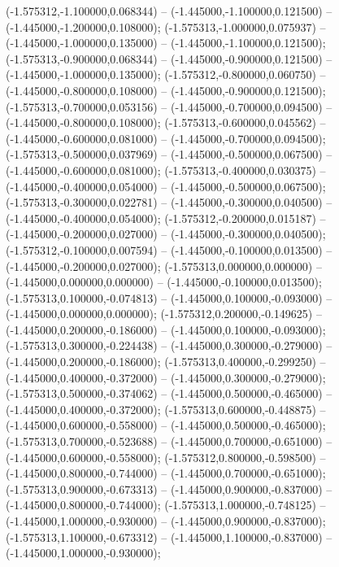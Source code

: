  (-1.575312,-1.100000,0.068344) -- (-1.445000,-1.100000,0.121500) -- (-1.445000,-1.200000,0.108000);
 (-1.575313,-1.000000,0.075937) -- (-1.445000,-1.000000,0.135000) -- (-1.445000,-1.100000,0.121500);
 (-1.575313,-0.900000,0.068344) -- (-1.445000,-0.900000,0.121500) -- (-1.445000,-1.000000,0.135000);
 (-1.575312,-0.800000,0.060750) -- (-1.445000,-0.800000,0.108000) -- (-1.445000,-0.900000,0.121500);
 (-1.575313,-0.700000,0.053156) -- (-1.445000,-0.700000,0.094500) -- (-1.445000,-0.800000,0.108000);
 (-1.575313,-0.600000,0.045562) -- (-1.445000,-0.600000,0.081000) -- (-1.445000,-0.700000,0.094500);
 (-1.575313,-0.500000,0.037969) -- (-1.445000,-0.500000,0.067500) -- (-1.445000,-0.600000,0.081000);
 (-1.575313,-0.400000,0.030375) -- (-1.445000,-0.400000,0.054000) -- (-1.445000,-0.500000,0.067500);
 (-1.575313,-0.300000,0.022781) -- (-1.445000,-0.300000,0.040500) -- (-1.445000,-0.400000,0.054000);
 (-1.575312,-0.200000,0.015187) -- (-1.445000,-0.200000,0.027000) -- (-1.445000,-0.300000,0.040500);
 (-1.575312,-0.100000,0.007594) -- (-1.445000,-0.100000,0.013500) -- (-1.445000,-0.200000,0.027000);
 (-1.575313,0.000000,0.000000) -- (-1.445000,0.000000,0.000000) -- (-1.445000,-0.100000,0.013500);
 (-1.575313,0.100000,-0.074813) -- (-1.445000,0.100000,-0.093000) -- (-1.445000,0.000000,0.000000);
 (-1.575312,0.200000,-0.149625) -- (-1.445000,0.200000,-0.186000) -- (-1.445000,0.100000,-0.093000);
 (-1.575313,0.300000,-0.224438) -- (-1.445000,0.300000,-0.279000) -- (-1.445000,0.200000,-0.186000);
 (-1.575313,0.400000,-0.299250) -- (-1.445000,0.400000,-0.372000) -- (-1.445000,0.300000,-0.279000);
 (-1.575313,0.500000,-0.374062) -- (-1.445000,0.500000,-0.465000) -- (-1.445000,0.400000,-0.372000);
 (-1.575313,0.600000,-0.448875) -- (-1.445000,0.600000,-0.558000) -- (-1.445000,0.500000,-0.465000);
 (-1.575313,0.700000,-0.523688) -- (-1.445000,0.700000,-0.651000) -- (-1.445000,0.600000,-0.558000);
 (-1.575312,0.800000,-0.598500) -- (-1.445000,0.800000,-0.744000) -- (-1.445000,0.700000,-0.651000);
 (-1.575313,0.900000,-0.673313) -- (-1.445000,0.900000,-0.837000) -- (-1.445000,0.800000,-0.744000);
 (-1.575313,1.000000,-0.748125) -- (-1.445000,1.000000,-0.930000) -- (-1.445000,0.900000,-0.837000);
 (-1.575313,1.100000,-0.673312) -- (-1.445000,1.100000,-0.837000) -- (-1.445000,1.000000,-0.930000);
